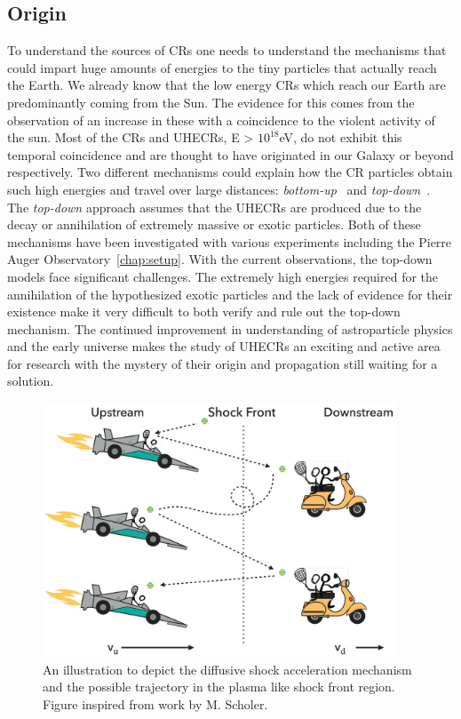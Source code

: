 \subsection{Origin}
\label{subsec:crorig}
To understand the sources of \glspl{CR} one needs to understand the mechanisms that could impart huge amounts of energies to the tiny particles that actually reach the Earth. We already know that the low energy \glspl{CR} which reach our Earth are predominantly coming from the Sun. The evidence for this comes from the observation of an increase in these with a coincidence to the violent activity of the sun. Most of the \glspl{CR} and \glspl{UHECR}, E > $10^{18}$eV, do not exhibit this temporal coincidence and are thought to have originated in our Galaxy or beyond respectively. Two different mechanisms could explain how the CR particles obtain such high energies and travel over large distances: \textit{bottom-up}~\cite{1984ARA&A..22..425H,Blandford_2000,1993A&A...272..161R} and \textit{top-down}~\cite{Bhattacharjee_2000,Busca_2006}. The \textit{top-down} approach assumes that the \glspl{UHECR} are produced due to the decay or annihilation of extremely massive or exotic particles.
Both of these mechanisms have been investigated with various experiments including the Pierre Auger Observatory~\ref{chap:setup}. With the current observations, the top-down models face significant challenges. The extremely high energies required for the annihilation of the hypothesized exotic particles and the lack of evidence for their existence make it very difficult to both verify and rule out the top-down mechanism. The continued improvement in understanding of astroparticle physics and the early universe makes the study of \glspl{UHECR} an exciting and active area for research with the mystery of their origin and propagation still waiting for a solution. 

\begin{figure}[t!]
  \centering
  \includegraphics[width=10.5cm]{thesis_figures/CRnNu/Diffusive-shock-cartoon.pdf}
  \caption{An illustration to depict the diffusive shock acceleration mechanism and the possible trajectory in the plasma like shock front region. Figure inspired from work by M. Scholer.}
  \label{fig:Shock_cartoon}
\end{figure}

